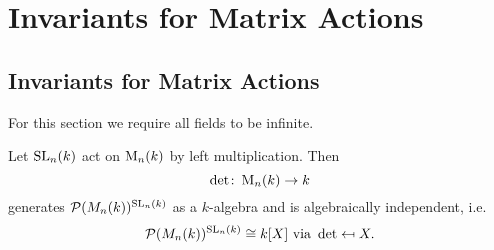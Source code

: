 \chapter{Invariants for Matrix Actions}





\section{Invariants for Matrix Actions}
For this section we require all fields to be infinite.


\begin{thrm}
  Let $\operatorname{SL}_n(k)$ act on $\operatorname{M}_n(k)$ by left multiplication. Then
  \[
            \det
    \colon  \operatorname{M}_n(k)
    \to     k
  \]
  generates $\mathcal{P}(M_n(k))^{\operatorname{SL}_n(k)}$ as a $k$-algebra and is algebraically independent, i.e.\
  \[
              \mathcal{P}(M_n(k))^{\operatorname{SL}_n(k)}
    \cong     k[X]
    \text{ via }
              \det
    \mapsfrom X.
  \]
\end{thrm}
